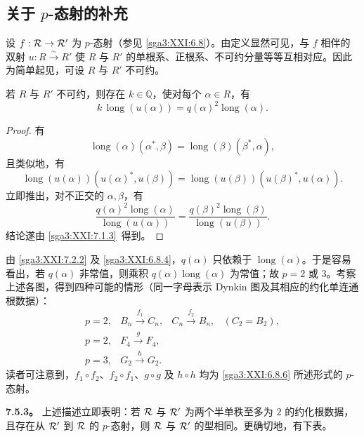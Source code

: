 \subsection{关于 \(p\)-态射的补充}\label{sga3:XXI:7.5}

设 \(f:\mathcal{R}\to\mathcal{R}'\) 为 \(p\)-态射（参见 \ref{sga3:XXI:6.8}）。由定义显然可见，与 \(f\) 相伴的双射 \(u:R\xrightarrow{\sim}R'\) 使 \(R\) 与 \(R'\) 的单根系、正根系、不可约分量等等互相对应。因此为简单起见，可设 \(R\) 与 \(R'\) 不可约。

\begin{lemma}\label{sga3:XXI:7.5.1}
若 \(R\) 与 \(R'\) 不可约，则存在 \(k\in\mathbb Q\)，使对每个 \(\alpha\in R\)，有
\[
 k\,\operatorname{long}(u(\alpha))
 =
 q(\alpha)^2\operatorname{long}(\alpha).
\]
\end{lemma}

\begin{proof}
有
\[
 \operatorname{long}(\alpha)(\alpha^\ast,\beta)
 =
 \operatorname{long}(\beta)(\beta^\ast,\alpha),
\]
且类似地，有
\[
 \operatorname{long}(u(\alpha))
   (u(\alpha)^\ast,u(\beta))
 =
 \operatorname{long}(u(\beta))
   (u(\beta)^\ast,u(\alpha)).
\]
立即推出，对不正交的 \(\alpha,\beta\)，有
\[
 \frac{q(\alpha)^2\operatorname{long}(\alpha)}
      {\operatorname{long}(u(\alpha))}
 =
 \frac{q(\beta)^2\operatorname{long}(\beta)}
      {\operatorname{long}(u(\beta))}.
\]
结论遂由 \ref{sga3:XXI:7.1.3}\, 得到。
\end{proof}

\begin{remark}\label{sga3:XXI:7.5.2}
由 \ref{sga3:XXI:7.2.2} 及 \ref{sga3:XXI:6.8.4}，\(q(\alpha)\) 只依赖于 \(\operatorname{long}(\alpha)\)。于是容易看出，若 \(q(\alpha)\) 非常值，则乘积 \(q(\alpha)\operatorname{long}(\alpha)\) 为常值；故 \(p=2\) 或 \(3\)。考察上述各图，得到四种可能的情形（同一字母表示 Dynkin 图及其相应的约化单连通根数据）：
\[
\begin{array}{llll}
p=2, & B_n\xrightarrow{\,f_1\,}C_n,
     & C_n\xrightarrow{\,f_2\,}B_n,
     & (C_2=B_2),\\
p=2, & F_4\xrightarrow{\,g\,}F_4,\\
p=3, & G_2\xrightarrow{\,h\,}G_2.
\end{array}
\]
读者可注意到，\(f_1\circ f_2\)、\(f_2\circ f_1\)、\(g\circ g\) 及 \(h\circ h\) 均为 \ref{sga3:XXI:6.8.6} 所述形式的 \(p\)-态射。
\end{remark}

\medskip
\noindent\textbf{7.5.3。}\label{sga3:XXI:7.5.3}
上述描述立即表明：若 \(\mathcal{R}\) 与 \(\mathcal{R}'\) 为两个半单秩至多为 \(2\) 的约化根数据，且存在从 \(\mathcal{R}'\) 到 \(\mathcal{R}\) 的 \(p\)-态射，则 \(\mathcal{R}\) 与 \(\mathcal{R}'\) 的型相同。更确切地，有下表。

